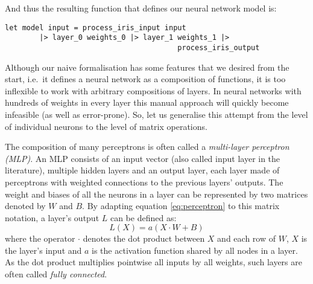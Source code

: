 \documentclass[runningheads]{llncs}
\begin{document}
And thus the resulting function that defines our neural network model is:


\begin{lstlisting}
let model input = process_iris_input input
        |> layer_0 weights_0 |> layer_1 weights_1 |>
                                        process_iris_output
\end{lstlisting}

Although our naive formalisation has some features that we desired from the start, i.e.\ it defines a neural network as a composition of functions,
it is too inflexible to work with arbitrary compositions of layers.
In neural networks with hundreds of weights in every layer this manual approach will quickly become infeasible (as well as error-prone).
So, let us generalise this attempt from the level of individual neurons to the level of matrix operations.

The composition of many perceptrons is often called a \emph{multi-layer perceptron (MLP)}.
An MLP consists of an input vector (also called input layer in the literature),
multiple hidden layers and an output layer, each layer 
made of perceptrons with weighted connections to the previous layers' outputs. %
The weight and biases of all the neurons in a layer can be represented by two matrices denoted by $W$ and $B$. By adapting equation \ref{eq:perceptron} to this matrix notation, a layer's output $L$ can be defined as:
\begin{equation}
	L(X) = a(X \cdot W + B)
\end{equation}
where the operator $\cdot $ denotes the dot product between $X$ and each row of $W$, %
$X$ is the layer's input and $a$ is the activation function shared by all nodes in a layer. %
As the dot product multiplies pointwise all inputs by all weights, such layers are often called \emph{fully connected}. %
\end{document}
